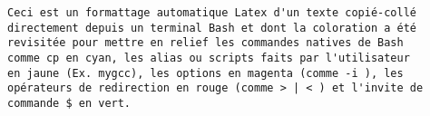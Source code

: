 \documentclass[a4paper, french]{report}
\begin{document}
\begin{mdframed}[style=Bash]
\begin{lstlisting}[style=Bash_pedago, caption=Exemple d'une capture formaté en style 'Tutoriel de Commande Bash' ou TCB]
Ceci est un formattage automatique Latex d'un texte copié-collé
directement depuis un terminal Bash et dont la coloration a été
revisitée pour mettre en relief les commandes natives de Bash
comme cp en cyan, les alias ou scripts faits par l'utilisateur 
en jaune (Ex. mygcc), les options en magenta (comme -i ), les 
opérateurs de redirection en rouge (comme > | < ) et l'invite de
commande $ en vert.
\end{lstlisting}
\end{mdframed}

\newpage
\pagestyle{empty}
\tableofcontents
{}
\pagestyle{plain}

\newpage





\end{document}
